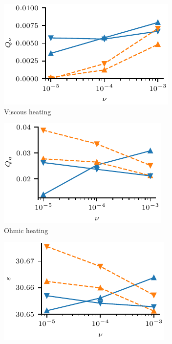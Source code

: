 \begin{figure}[t]
    \hfill
    \begin{subfigure}{0.32\textwidth}
      \centering
  \includegraphics[width=1.0\linewidth]{param_study/final_visc_heating.pdf}
      \caption{Viscous heating}%
      \label{fig:ps_visc_heating}
    \end{subfigure}
    \hfill
    \begin{subfigure}{0.32\textwidth}
      \centering
  \includegraphics[width=1.0\linewidth]{param_study/final_ohmic_heating.pdf}
      \caption{Ohmic heating}%
      \label{fig:ps_ohmic_heating}
    \end{subfigure}
    \hfill
    \begin{subfigure}{0.32\textwidth}
      \centering
  \includegraphics[width=1.0\linewidth]{param_study/final_internal_energy.pdf}

\end{subfigure}
\end{figure}
